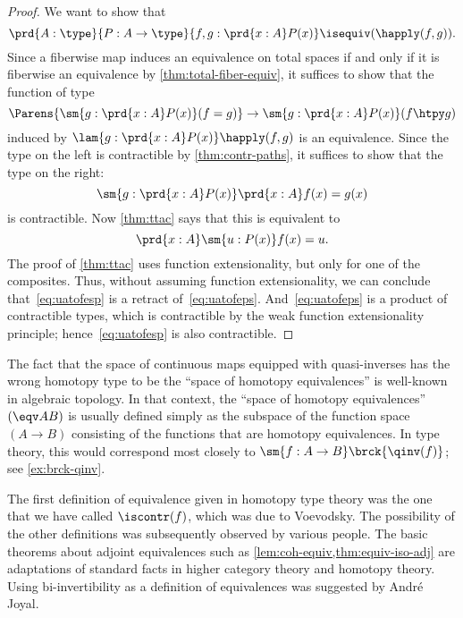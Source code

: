 \begin{proof}
We want to show that
\begin{equation*}
\prd{A:\type}{P:A\to\type}{f,g:\prd{x:A}P(x)}\isequiv(\happly (f,g)).
\end{equation*}
Since a fiberwise map induces an equivalence on total spaces if and only if it is fiberwise an equivalence by \cref{thm:total-fiber-equiv}, it suffices to show that the function of type
\begin{equation*}
\Parens{\sm{g:\prd{x:A}P(x)}(f= g)} \to \sm{g:\prd{x:A}P(x)}(f\htpy g)
\end{equation*}
induced by $\lam{g:\prd{x:A}P(x)} \happly (f,g)$ is an equivalence.
Since the type on the left is contractible by \cref{thm:contr-paths}, it suffices to show that the type on the right:
\begin{equation}\label{eq:uatofesp}
\sm{g:\prd{x:A}P(x)}\prd{x:A}f(x)= g(x)
\end{equation}
is contractible.
Now \cref{thm:ttac} says that this is equivalent to
\begin{equation}\label{eq:uatofeps}
\prd{x:A}\sm{u:P(x)}f(x)= u.
\end{equation}
The proof of \cref{thm:ttac} uses function extensionality, but only for one of the composites.
Thus, without assuming function extensionality, we can conclude that~\eqref{eq:uatofesp} is a retract of~\eqref{eq:uatofeps}.
And~\eqref{eq:uatofeps} is a product of contractible types, which is contractible by the weak function extensionality principle; hence~\eqref{eq:uatofesp} is also contractible.
\end{proof}

\sectionNotes

The fact that the space of continuous maps equipped with quasi-inverses has the wrong homotopy type to be the ``space of homotopy equivalences'' is well-known in algebraic topology.
In that context, the ``space of homotopy equivalences'' $(\eqv AB)$ is usually defined simply as the subspace of the function space $(A\to B)$ consisting of the functions that are homotopy equivalences.
In type theory, this would correspond most closely to $\sm{f:A\to B} \brck{\qinv(f)}$; see \cref{ex:brck-qinv}.

The first definition of equivalence given in homotopy type theory was the one that we have called $\iscontr(f)$, which was due to Voevodsky.
The possibility of the other definitions was subsequently observed by various people.
The basic theorems about adjoint equivalences such as \cref{lem:coh-equiv,thm:equiv-iso-adj} are adaptations of standard facts in higher category theory and homotopy theory.
Using bi-invertibility as a definition of equivalences was suggested by Andr\'e Joyal.


